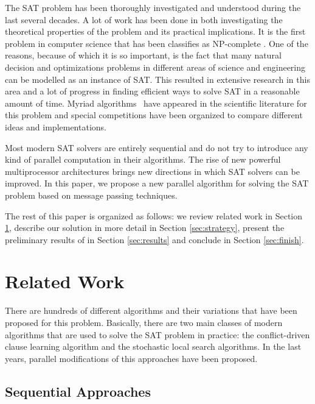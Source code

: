 \documentclass[letterpaper, compsoc, conference]{IEEEtran}
\begin{document}
The SAT problem has been thoroughly investigated and understood during the last
several decades. A lot of work has been done in both investigating the
theoretical properties of the problem and its practical implications. It is the
first problem in computer science that has been classifies as NP-complete
\cite{SATNP}. One of the reasons, because of which it is so important, is the
fact that many natural decision and optimizations problems in different areas
of science and engineering can be modelled as an instance of SAT. This resulted
in extensive research in this area and a lot of progress in finding efficient
ways to solve SAT in a reasonable amount of time. Myriad
algorithms~\cite{CHAFF, GRASP, MiniSat,PSATO,WalkSAT,DPLL,GRADSAT,ManySAT} have
appeared in the scientific literature for this problem and special competitions
\cite{SATRace2008} have been organized to compare different ideas and
implementations.  \cite{GRASP}

Most modern SAT solvers are entirely sequential and do not try to introduce any
kind of parallel computation in their algorithms. The rise of new powerful
multiprocessor architectures brings new directions in which SAT solvers can be
improved. In this paper, we propose a new parallel algorithm for solving the
SAT problem based on message passing techniques.

The rest of this paper is organized as follows: we review related work in
Section \ref{sec:related}, describe our solution in more detail in Section
\ref{sec:strategy}, present the preliminary results of in Section
\ref{sec:results} and conclude in Section \ref{sec:finish}.

\section{Related Work}
\label{sec:related}

There are hundreds of different algorithms and their variations that have been
proposed for this problem. Basically, there are two main classes of modern
algorithms that are used to solve the SAT problem in practice: the
conflict-driven clause learning algorithm and the stochastic local search
algorithms. In the last years, parallel modifications of this approaches have
been proposed.

\subsection{Sequential Approaches}
\end{document}

